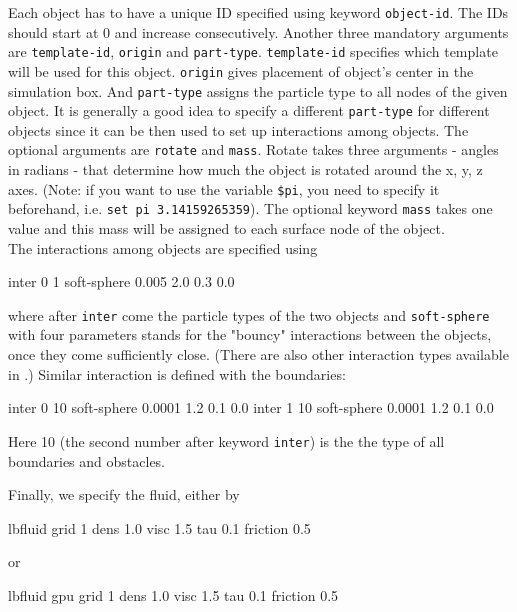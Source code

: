 \documentclass[
a4paper,                        %
11pt,                           %
twoside,                        %
footsepline,                    %
headsepline,                    %
headexclude,                    %
footexclude,                    %
pagesize,                       %
]{scrartcl}
\begin{document}
Each object has to have a unique ID specified using keyword \verb|object-id|. The IDs should start at 0 and increase consecutively. Another three mandatory arguments are \verb|template-id|, \verb|origin| and \verb|part-type|. \verb|template-id| specifies which template will be used for this object. \verb|origin| gives placement of object's center in the simulation box. And \verb|part-type| assigns the particle type to all nodes of the given object. It is generally a good idea to specify a different \verb|part-type| for different objects since it can be then used to set up interactions among objects. The optional arguments are \verb|rotate| and \verb|mass|. Rotate takes three arguments - angles in radians - that determine how much the object is rotated around the x, y, z axes. (Note: if you want to use the variable  \verb|$pi|, you need to specify it beforehand, i.e. \verb|set pi 3.14159265359|). The optional keyword \verb|mass| takes one value and this mass will be assigned to each surface node of the object.\\

The interactions among objects are specified using\\   
\begin{tclcode}
  inter 0 1 soft-sphere 0.005 2.0 0.3 0.0
\end{tclcode}
\vspace{0 mm} 

where after \verb|inter| come the particle types of the two objects and \verb|soft-sphere| with four parameters stands for the "bouncy" interactions between the objects, once they come sufficiently close. (There are also other interaction types available in \es.) Similar interaction is defined with the boundaries:\\
\begin{tclcode}
 inter 0 10 soft-sphere 0.0001 1.2 0.1 0.0
 inter 1 10 soft-sphere 0.0001 1.2 0.1 0.0
\end{tclcode}  
\vspace{0 mm}

Here 10 (the second number after keyword \verb|inter|) is the the type of all boundaries and obstacles.

Finally, we specify the fluid, either by\\
\begin{tclcode}
 lbfluid grid 1 dens 1.0 visc 1.5 tau 0.1 friction 0.5
\end{tclcode}
\vspace{0 mm}

or\\ 
 \begin{tclcode}
 lbfluid gpu grid 1 dens 1.0 visc 1.5 tau 0.1 friction 0.5
\end{tclcode}
\vspace{0 mm}
\end{document}
